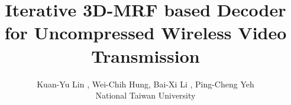 \documentclass[10pt,twocolumn,twoside]{IEEEtran}
\begin{document}
\title{Iterative 3D-MRF based Decoder \\ for Uncompressed Wireless Video Transmission}


\author{ Kuan-Yu Lin , Wei-Chih Hung, Bai-Xi Li , Ping-Cheng Yeh \\
National Taiwan University}%

% 
%



% 









\maketitle
\end{document}
